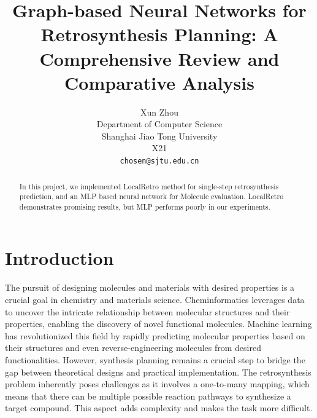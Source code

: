\documentclass{article}
\title{Graph-based Neural Networks for Retrosynthesis Planning: A Comprehensive Review and Comparative Analysis}
\author{
  Xun Zhou\\
  Department of Computer Science\\
  Shanghai Jiao Tong University\\
  X21 \\
  \texttt{chosen@sjtu.edu.cn} \\
}
\begin{document}
\maketitle
\linespread{1.5}
\begin{abstract}
  In this project, we implemented LocalRetro method for single-step retrosynthesis prediction, and an MLP based neural network for Molecule evaluation. LocalRetro demonstrates promising results, but MLP performs poorly in our experiments.

\end{abstract}
  

\section{Introduction}

The pursuit of designing molecules and materials with desired properties is a crucial goal in chemistry and materials science. Cheminformatics leverages data to uncover the intricate relationship between molecular structures and their properties, enabling the discovery of novel functional molecules. Machine learning has revolutionized this field by rapidly predicting molecular properties based on their structures and even reverse-engineering molecules from desired functionalities. However, synthesis planning remains a crucial step to bridge the gap between theoretical designs and practical implementation. The retrosynthesis problem inherently poses challenges as it involves a one-to-many mapping, which means that there can be multiple possible reaction pathways to synthesize a target compound. This aspect adds complexity and makes the task more difficult.



\end{document}
